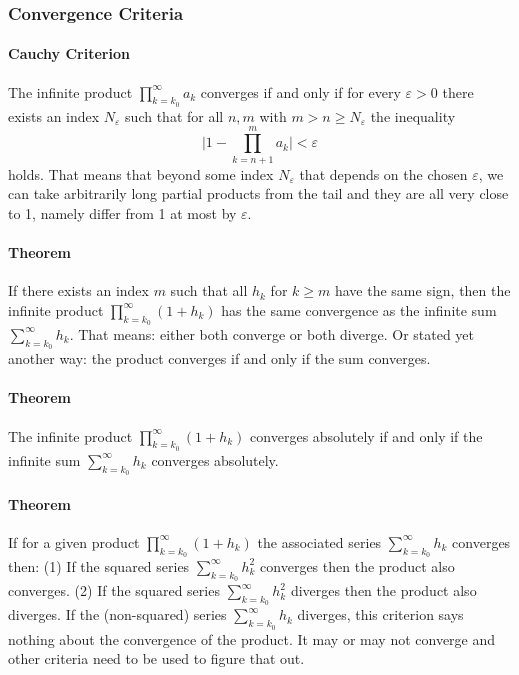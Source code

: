 \subsubsection{Convergence Criteria}


\paragraph{Cauchy Criterion} The infinite product $\prod_{k=k_0}^{\infty} a_k$ converges if and only if for every $\varepsilon > 0$ there exists an index $N_{\varepsilon}$ such that for all $n,m$ with $m > n \geq N_{\varepsilon}$ the inequality 
\begin{equation}
 \Bigg| 1 -\prod_{k=n+1}^{m} a_k \Bigg| < \varepsilon
\end{equation}
holds. That means that beyond some index $N_{\varepsilon}$ that depends on the chosen $\varepsilon$, we can take arbitrarily long partial products from the tail and they are all very close to 1, namely differ from 1 at most by $\varepsilon$.


\paragraph{Theorem} If there exists an index $m$ such that all $h_k$ for $k \geq m$ have the same sign, then the infinite product $\prod_{k=k_0}^{\infty} (1 + h_k)$ has the same convergence as the infinite sum $\sum_{k=k_0}^{\infty} h_k$. That means: either both converge or both diverge. Or stated yet another way: the product converges if and only if the sum converges. 

\paragraph{Theorem} The infinite product $\prod_{k=k_0}^{\infty} (1 + h_k)$ converges absolutely if and only if  the infinite sum $\sum_{k=k_0}^{\infty} h_k$ converges absolutely.

\paragraph{Theorem} If for a given product $\prod_{k=k_0}^{\infty} (1 + h_k)$ the associated series  $\sum_{k=k_0}^{\infty} h_k$ converges then: (1) If the squared series $\sum_{k=k_0}^{\infty} h_k^2$ converges then the product also converges.  (2) If the squared series $\sum_{k=k_0}^{\infty} h_k^2$ diverges then the product also diverges. If the (non-squared) series $\sum_{k=k_0}^{\infty} h_k$ diverges, this criterion says nothing about the convergence of the product. It may or may not converge and other criteria need to be used to figure that out.




